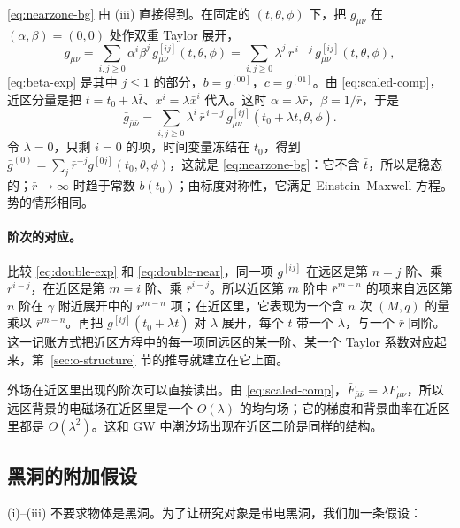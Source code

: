 \documentclass[11pt,a4paper]{ctexart}
\begin{document}
\eqref{eq:nearzone-bg} 由 (iii) 直接得到。在固定的 $(t,\theta,\phi)$ 下，把 $g_{\mu\nu}$ 在 $(\alpha,\beta)=(0,0)$ 处作双重 Taylor 展开，
\begin{equation}
g_{\mu\nu}=\sum_{i,j\ge0}\alpha^i\beta^j\,g^{[ij]}_{\mu\nu}(t,\theta,\phi)=\sum_{i,j\ge0}\lambda^j\,r^{\,i-j}\,g^{[ij]}_{\mu\nu}(t,\theta,\phi),
\label{eq:double-exp}
\end{equation}
\eqref{eq:beta-exp} 是其中 $j\le1$ 的部分，$b=g^{[00]}$，$c=g^{[01]}$。由 \eqref{eq:scaled-comp}，近区分量是把 $t=t_0+\lambda\bar t$、$x^i=\lambda\bar x^i$ 代入。这时 $\alpha=\lambda\bar r$，$\beta=1/\bar r$，于是
\begin{equation}
\bar g_{\bar\mu\bar\nu}=\sum_{i,j\ge0}\lambda^i\,\bar r^{\,i-j}\,g^{[ij]}_{\mu\nu}(t_0+\lambda\bar t,\theta,\phi).
\label{eq:double-near}
\end{equation}
令 $\lambda=0$，只剩 $i=0$ 的项，时间变量冻结在 $t_0$，得到 $\bar g^{(0)}=\sum_j\bar r^{-j}g^{[0j]}(t_0,\theta,\phi)$，这就是 \eqref{eq:nearzone-bg}：它不含 $\bar t$，所以是稳态的；$\bar r\to\infty$ 时趋于常数 $b(t_0)$；由标度对称性，它满足 Einstein--Maxwell 方程。势的情形相同。

\paragraph{阶次的对应。}比较 \eqref{eq:double-exp} 和 \eqref{eq:double-near}，同一项 $g^{[ij]}$ 在远区是第 $n=j$ 阶、乘 $r^{i-j}$，在近区是第 $m=i$ 阶、乘 $\bar r^{i-j}$。所以近区第 $m$ 阶中 $\bar r^{m-n}$ 的项来自远区第 $n$ 阶在 $\gamma$ 附近展开中的 $r^{m-n}$ 项；在近区里，它表现为一个含 $n$ 次 $(M,q)$ 的量乘以 $\bar r^{m-n}$。再把 $g^{[ij]}(t_0+\lambda\bar t)$ 对 $\lambda$ 展开，每个 $\bar t$ 带一个 $\lambda$，与一个 $\bar r$ 同阶。这一记账方式把近区方程中的每一项同远区的某一阶、某一个 Taylor 系数对应起来，第~\ref{sec:o-structure} 节的推导就建立在它上面。

外场在近区里出现的阶次可以直接读出。由 \eqref{eq:scaled-comp}，$\bar F_{\bar\mu\bar\nu}=\lambda F_{\mu\nu}$，所以远区背景的电磁场在近区里是一个 $O(\lambda)$ 的均匀场；它的梯度和背景曲率在近区里都是 $O(\lambda^2)$。这和 GW 中潮汐场出现在近区二阶是同样的结构。

\subsection{黑洞的附加假设}\label{sec:H}

(i)--(iii) 不要求物体是黑洞。为了让研究对象是带电黑洞，我们加一条假设：
\end{document}
